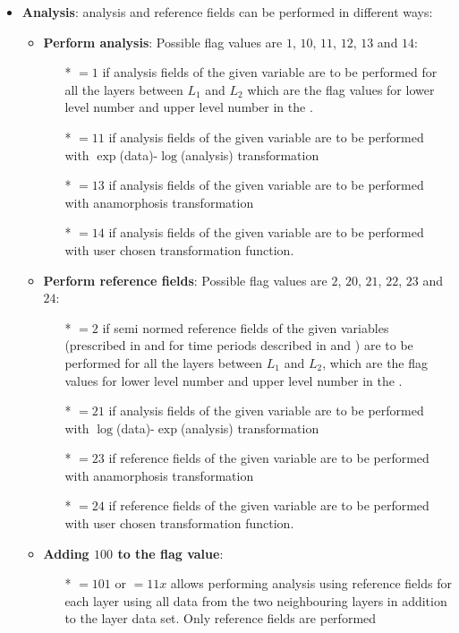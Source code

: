 \begin{itemize}
\item {\bf Analysis}: analysis and reference fields can be performed in different ways:
  \begin{itemize}
  \item  {\bf Perform analysis}: Possible flag values are $1$, $10$, $11$, $12$, $13$ and $14$:
              \begin{itemize}
                \item[*] $=1$ if analysis fields of the given variable are to be performed for all the layers between $L_1$ and $L_2$ which are the flag values for lower level number and upper level number in the .
                \item[*] $=11$ if analysis fields of the given variable are to be performed with $\exp$(data)-$\log$(analysis) transformation
                \item[*] $=13$ if analysis fields of the given variable are to be performed with anamorphosis transformation
                \item[*] $=14$ if analysis fields of the given variable are to be performed with user chosen transformation function.
              \end{itemize}
   \item  {\bf Perform reference fields}: Possible flag values are $2$, $20$, $21$, $22$, $23$ and $24$:
              \begin{itemize}
                \item[*] $=2$ if semi normed reference fields of the given variables (prescribed in  and for time periods described in  and ) are to be performed for all the layers between $L_1$ and $L_2$, which are the flag values for lower level number and upper level number in the .
                \item[*] $=21$ if analysis fields of the given variable are to be performed with $\log$(data)-$\exp$(analysis) transformation
                \item[*] $=23$ if reference fields of the given variable are to be performed with anamorphosis transformation
                \item[*] $=24$ if reference fields of the given variable are to be performed with user chosen transformation function.
              \end{itemize}
  \item  {\bf Adding $100$ to the flag value}:
              \begin{itemize}
               \item[*] $=101$ or $=11x$ allows performing analysis using reference fields for each layer using all data from the two neighbouring layers in addition to the layer data set. Only reference fields are performed

\end{itemize}
\end{itemize}
\end{itemize}

